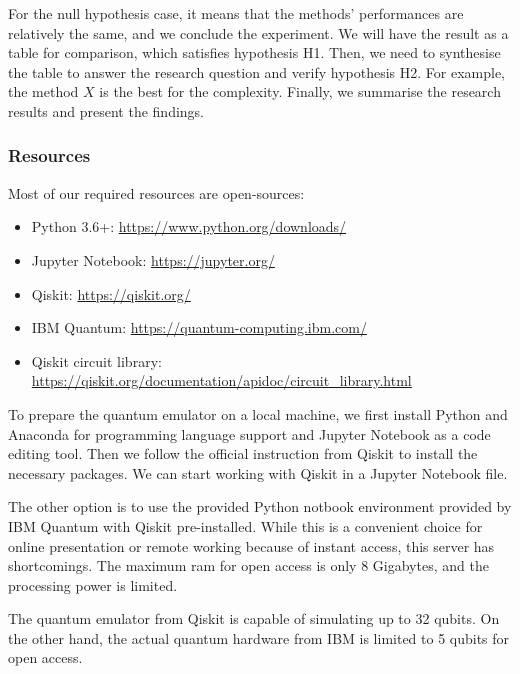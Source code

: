 For the null hypothesis case, it means that the methods' performances are relatively the same, and we conclude the experiment.
We will have the result as a table for comparison, which satisfies hypothesis H1.
Then, we need to synthesise the table to answer the research question and verify hypothesis H2.
For example, the method $X$ is the best for the complexity.
Finally, we summarise the research results and present the findings.

\subsubsection{Resources} \label{Resources section}
Most of our required resources are open-sources:
\begin{itemize}
    \item Python 3.6+: \url{https://www.python.org/downloads/}
    \item Jupyter Notebook: \url{https://jupyter.org/}
    \item Qiskit: \url{https://qiskit.org/}
    \item IBM Quantum: \url{https://quantum-computing.ibm.com/}
    \item Qiskit circuit library: \url{https://qiskit.org/documentation/apidoc/circuit_library.html}
\end{itemize}

To prepare the quantum emulator on a local machine, we first install Python and Anaconda for programming language support and Jupyter Notebook as a code editing tool.
Then we follow the official instruction from Qiskit \cite{Qiskit} to install the necessary packages.
We can start working with Qiskit in a Jupyter Notebook file.

The other option is to use the provided Python notbook environment provided by IBM Quantum with Qiskit pre-installed.
While this is a convenient choice for online presentation or remote working because of instant access, this server has shortcomings.
The maximum ram for open access is only 8 Gigabytes, and the processing power is limited.

The quantum emulator from Qiskit is capable of simulating up to 32 qubits.
On the other hand, the actual quantum hardware from IBM is limited to 5 qubits for open access.

